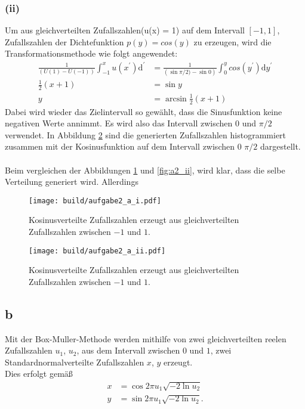 \subsubsection*{(ii)}
Um aus gleichverteilten Zufallszahlen(u(x) = 1) auf dem Intervall $[-1,1]$, Zufallszahlen
der Dichtefunktion $p(y) = cos(y)$ zu erzeugen, wird die Transformationsmethode
wie folgt angewendet:
\begin{align*}
  \frac{1}{\left(U(1) - U(-1)\right)} \int_{-1}^{x} u(x^\prime) \mathrm{d}^\prime &= \frac{1}{\left( \sin \pi /2) - \sin 0 \right) }\int_{0}^{y} cos(y^\prime) \mathrm{d}y^\prime\\
  \frac{1}{2} \left( x + 1 \right) &= \sin y \\
  y &= \arcsin \frac{1}{2} \left( x + 1 \right)
\end{align*}
Dabei wird wieder das Zielintervall so gewählt, dass die Sinusfunktion keine negativen Werte annimmt. Es wird also das Intervall
zwischen $0$ und $\pi / 2$ verwendet.
In Abbildung \ref{fig:a2_a_ii} sind die generierten Zufallszahlen histogrammiert zusammen mit der Kosinusfunktion auf dem Intervall zwischen $0$ $\pi / 2$ dargestellt. \\ \\
Beim vergleichen der Abbildungen \ref{fig:a2_a_i} und \ref{fig:a2_ii}, wird klar, dass die selbe Verteilung generiert wird.
Allerdings

\begin{figure}[h]
  \centering
  \texttt{[image: build/aufgabe2\_a\_i.pdf]}
  \caption{Kosinusverteilte Zufallszahlen erzeugt aus gleichverteilten Zufallszahlen zwischen $-1$ und $1$.}
  \label{fig:a2_a_i}
\end{figure}

\begin{figure}[h]
  \centering
  \texttt{[image: build/aufgabe2\_a\_ii.pdf]}
  \caption{Kosinusverteilte Zufallszahlen erzeugt aus gleichverteilten Zufallszahlen zwischen $-1$ und $1$.}
  \label{fig:a2_a_ii}
\end{figure}


\subsection*{b}
Mit der Box-Muller-Methode werden mithilfe von zwei gleichverteilten reelen Zufallszahlen $u_1$, $u_2$, aus dem Intervall zwischen
$0$ und $1$, zwei Standardnormalverteilte Zufallszahlen $x$, $y$ erzeugt. \\
Dies erfolgt gemäß
\begin{align*}
  x &= \cos 2\pi u_1 \sqrt{-2 \ln u_2} \\
  y &= \sin 2\pi u_1 \sqrt{-2 \ln u_2} .
\end{align*}

